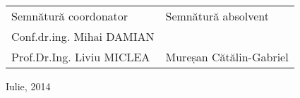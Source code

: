 \documentclass[12pt,a4paper,twoside]{report}
\begin{document}
\begin{titlepage}
\begin{flushleft}
\end{flushleft}

\vspace{0.5cm}

\begin{center}

%
\begin{tabularx}{\textwidth}{lR}
Semnătură coordonator & Semnătură absolvent \\
Conf.dr.ing. Mihai DAMIAN\\Prof.Dr.Ing. Liviu MICLEA & Mureșan Cătălin-Gabriel \\
\end{tabularx}

Iulie, 2014\\

\end{center}

\end{titlepage}


\begin{titlepage}
\phantom{1}
\end{titlepage}
\end{document}
